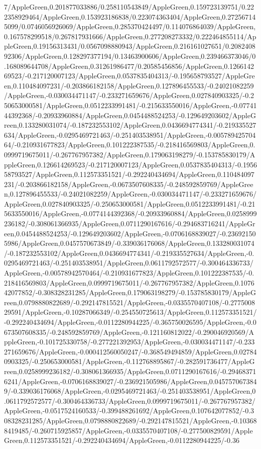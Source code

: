 {\begin{tikzternal}
{7/AppleGreen,0.201877033886/0.258110543849/AppleGreen,0.159723139751/0.222358929464/AppleGreen,0.153923186838/0.223074363404/AppleGreen,0.272567145099/0.0746056926069/AppleGreen,0.285370424497/0.114076864039/AppleGreen,0.167578299518/0.267817931666/AppleGreen,0.277208273332/0.222464855114/AppleGreen,0.19156313431/0.0567098880943/AppleGreen,0.216161027651/0.208240892306/AppleGreen,0.128297377194/0.13463900606/AppleGreen,0.239466373046/0.168089644708/AppleGreen,0.31261986477/0.20585456856/AppleGreen,0.126614269523/-0.217120007123/AppleGreen,0.0537835404313/-0.195658793527/AppleGreen,0.110484097231/-0.203866182158/AppleGreen,0.127896455533/-0.24021082259/AppleGreen,-0.030034471147/-0.233271659676/AppleGreen,0.027840903325/-0.250653000581/AppleGreen,0.0512233991481/-0.215633550016/AppleGreen,-0.0774144392368/-0.20933960884/AppleGreen,0.0454488524253/-0.129649203602/AppleGreen,0.133280031074/-0.187232553102/AppleGreen,0.0436694774341/-0.219335527634/AppleGreen,-0.0295469721463/-0.251403538951/AppleGreen,-0.00578942570464/-0.210931677823/AppleGreen,0.101222387535/-0.218416569803/AppleGreen,0.0999719675011/-0.267767957382/AppleGreen,0.179063198279/-0.153785830179/AppleGreen,0.126614269523/-0.217120007123/AppleGreen,0.0537835404313/-0.195658793527/AppleGreen,0.112573351521/-0.292240434694/AppleGreen,0.110484097231/-0.203866182158/AppleGreen,-0.0673507608335/-0.248592859769/AppleGreen,0.127896455533/-0.24021082259/AppleGreen,-0.030034471147/-0.233271659676/AppleGreen,0.027840903325/-0.250653000581/AppleGreen,0.0512233991481/-0.215633550016/AppleGreen,-0.0774144392368/-0.20933960884/AppleGreen,0.0258999236182/-0.308061366935/AppleGreen,0.0711290167616/-0.294683716241/AppleGreen,0.0454488524253/-0.129649203602/AppleGreen,-0.0706168839027/-0.236921505986/AppleGreen,0.0457570673849/-0.339036176068/AppleGreen,0.133280031074/-0.187232553102/AppleGreen,0.0436694774341/-0.219335527634/AppleGreen,-0.0295469721463/-0.251403538951/AppleGreen,0.0611792572577/-0.300464336733/AppleGreen,-0.00578942570464/-0.210931677823/AppleGreen,0.101222387535/-0.218416569803/AppleGreen,0.0999719675011/-0.267767957382/AppleGreen,0.107642077852/-0.308328231285/AppleGreen,0.179063198279/-0.153785830179/AppleGreen,0.0798880822689/-0.292147815521/AppleGreen,-0.0335570407108/-0.277500829591/AppleGreen,-0.10287066349/-0.254550725613/AppleGreen,0.112573351521/-0.292240434694/AppleGreen,-0.0112280944225/-0.365750026595/AppleGreen,-0.0673507608335/-0.248592859769/AppleGreen,-0.121160812022/-0.290046920569/AppleGreen,-0.101725330758/-0.277221392953/AppleGreen,-0.030034471147/-0.233271659676/AppleGreen,-0.000412560050247/-0.368549494859/AppleGreen,0.027840903325/-0.250653000581/AppleGreen,-0.112768895867/-0.282591736477/AppleGreen,0.0258999236182/-0.308061366935/AppleGreen,0.0711290167616/-0.294683716241/AppleGreen,-0.0706168839027/-0.236921505986/AppleGreen,0.0457570673849/-0.339036176068/AppleGreen,-0.0295469721463/-0.251403538951/AppleGreen,0.0611792572577/-0.300464336733/AppleGreen,0.0999719675011/-0.267767957382/AppleGreen,-0.0517524160533/-0.399488261692/AppleGreen,0.107642077852/-0.308328231285/AppleGreen,0.0798880822689/-0.292147815521/AppleGreen,-0.103688419485/-0.260715925857/AppleGreen,-0.0335570407108/-0.277500829591/AppleGreen,0.112573351521/-0.292240434694/AppleGreen,-0.0112280944225/-0.36}
\end{tikzternal}}
